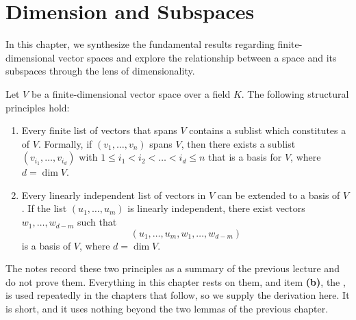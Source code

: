 \renewcommand{\thetheorem}{12.\arabic{theorem}}
\setcounter{theorem}{0}
\setcounter{chapter}{11} %

\chapter{Dimension and Subspaces}
In this chapter, we synthesize the fundamental results regarding finite-di\-men\-sional vector spaces and explore the relationship between a space and its subspaces through the lens of dimensionality.

\begin{summary}
\label{sum:finite_dim_properties}
Let $V$ be a finite-di\-men\-sional vector space over a field $K$. The following structural principles hold:
\begin{enumerate}
    \item Every finite list of vectors that spans $V$ contains a sublist which constitutes a  of $V$. Formally, if $(v_1, \dots, v_n)$ spans $V$, then there exists a sublist $(v_{i_1}, \dots, v_{i_d})$ with $1 \le i_1 < i_2 < \dots < i_d \le n$ that is a basis for $V$, where $d = \dim V$.
    \item Every linearly independent list of vectors in $V$ can be extended to a basis of $V$. If the list $(u_1, \dots, u_m)$ is linearly independent, there exist vectors $w_1, \dots, w_{d-m}$ such that 
    \[(u_1, \dots, u_m, w_1, \dots, w_{d-m})\] 
    is a basis of $V$, where $d = \dim V$.
\end{enumerate}
\end{summary}

The notes record these two principles as a summary of the previous lecture and
do not prove them. Everything in this chapter rests on them, and item
\textbf{(b)}, the , is used repeatedly in the
chapters that follow, so we supply the derivation here. It is short, and it uses
nothing beyond the two lemmas of the previous chapter.

